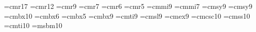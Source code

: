 
%





\font\titlefont=cmr17
\font\twelverm=cmr12
\font\ninerm=cmr9
\font\sevenrm=cmr7
\font\sixrm=cmr6
\font\fiverm=cmr5
\font\ninei=cmmi9
\font\seveni=cmmi7
\font\ninesy=cmsy9
\font\sevensy=cmsy9
\font\tenbf=cmbx10
\font\sixbf=cmbx6
\font\fivebf=cmbx5
\font\ninebf=cmbx9
\font\nineit=cmti9
\font\ninesl=cmsl9
\font\nineex=cmex9
\font\cmsc=cmcsc10
\font\dfont=cmss10
\let\dfont\bf
\font\efont=cmti10
\font\Bbb=msbm10

\def\ninepoint{\def\rm{\fam0\ninerm}
    \textfont0 = \ninerm
    \textfont1 = \ninei
    \textfont2 = \ninesy
    \textfont3 = \nineex
    \scriptfont0 = \sevenrm
    \scriptfont1 = \seveni
    \scriptfont2 = \sevensy
    \scriptscriptfont0 = \fiverm
    \scriptscriptfont1 = \fivei
    \scriptscriptfont2 = \fivesy
    \textfont\itfam=\nineit \def\it{\fam\itfam\nineit}
    \textfont\bffam=\ninebf \scriptfont\bffam=\sixbf
    \scriptscriptfont\bffam=\fivebf \def\bf{\fam\bffam\ninebf}
    \textfont\slfam=\ninesl \def\sl{\fam\slfam\ninesl}
    \baselineskip 10pt}

